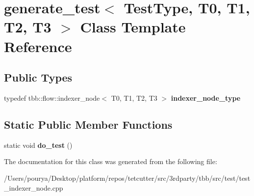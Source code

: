 \hypertarget{classgenerate__test_3_01TestType_00_01T0_00_01T1_00_01T2_00_01T3_01_4}{}\section{generate\+\_\+test$<$ Test\+Type, T0, T1, T2, T3 $>$ Class Template Reference}
\label{classgenerate__test_3_01TestType_00_01T0_00_01T1_00_01T2_00_01T3_01_4}
\subsection*{Public Types}
\begin{DoxyCompactItemize}
\item 
\hypertarget{classgenerate__test_3_01TestType_00_01T0_00_01T1_00_01T2_00_01T3_01_4_a10102f5369242eea0bc5af30c92b422b}{}typedef tbb\+::flow\+::indexer\+\_\+node$<$ T0, T1, T2, T3 $>$ {\bfseries indexer\+\_\+node\+\_\+type}\label{classgenerate__test_3_01TestType_00_01T0_00_01T1_00_01T2_00_01T3_01_4_a10102f5369242eea0bc5af30c92b422b}

\end{DoxyCompactItemize}
\subsection*{Static Public Member Functions}
\begin{DoxyCompactItemize}
\item 
\hypertarget{classgenerate__test_3_01TestType_00_01T0_00_01T1_00_01T2_00_01T3_01_4_ab904dcd475facf7ad6dc61612132ae07}{}static void {\bfseries do\+\_\+test} ()\label{classgenerate__test_3_01TestType_00_01T0_00_01T1_00_01T2_00_01T3_01_4_ab904dcd475facf7ad6dc61612132ae07}

\end{DoxyCompactItemize}


The documentation for this class was generated from the following file\+:\begin{DoxyCompactItemize}
\item 
/\+Users/pourya/\+Desktop/platform/repos/tetcutter/src/3rdparty/tbb/src/test/test\+\_\+indexer\+\_\+node.\+cpp\end{DoxyCompactItemize}
